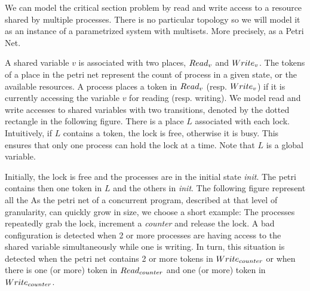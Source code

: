 \begin{wrapfigure}{r}[2pt]{0.6\textwidth}
\begin{center}
\end{center}
\vspace{-10mm}
\end{wrapfigure}
%
We can model the critical section problem by read and write access to
a resource shared by multiple processes. There is no particular
topology so we will model it as an instance of a parametrized system
with multisets. More precisely, as a Petri Net.

A shared variable $v$ is associated with two places, $Read_{v}$ and
$Write_{v}$. The tokens of a place in the petri net represent the count
of process in a given state, or the available resources.  A process
places a token in $Read_{v}$ (resp. $Write_{v}$) if it is currently
accessing the variable $v$ for reading (resp. writing). We model read
and write accesses to shared variables with two transitions, denoted
by the dotted rectangle in the following figure. There is a place $L$
associated with each lock. Intuitively, if $L$ contains a token, the
lock is free, otherwise it is busy. This ensures that only one process
can hold the lock at a time. Note that $L$ is a global variable.

Initially, the lock is free and the processes are in the initial state
\emph{init}. The petri contains then one token in $L$ and the others
in \emph{init}. The following figure represent all the As the petri
net of a concurrent program, described at that level of granularity,
can quickly grow in size, we choose a short example: The processes
repeatedly grab the lock, increment a \emph{counter} and release the
lock. A bad configuration is detected when 2 or more processes are
having access to the shared variable simultaneously while one is
writing. In turn, this situation is detected when the petri net
contains 2 or more tokens in $Write_{counter}$ or when there is one (or
more) token in $Read_{counter}$ and one (or more) token in
$Write_{counter}$.
